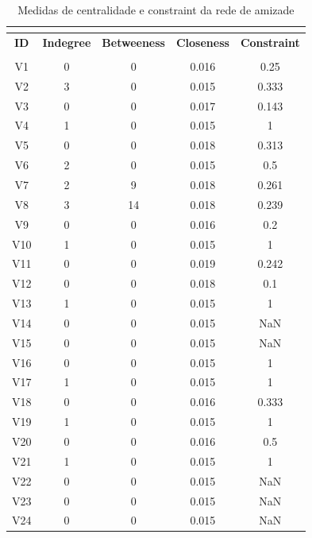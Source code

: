 \documentclass[a4paper, 12pt, openright, oneside, german, french, english, brazil]{abntex2}
\begin{document}
		\begin{SingleSpace}
		\begin{footnotesize}
			\begin{center}
				\begin{longtable}{c c c c c}
					\caption{Medidas de centralidade e constraint da rede de amizade}\\
					\label{centralidades:amizade}\\
					\hline
					\textbf{ID}  & \textbf{Indegree} & \textbf{Betweeness} & \textbf{Closeness} & \textbf{Constraint} \\
					\hline
					\endfirsthead
					\hline
					\endhead
					\hline
					\endfoot
					\hline
					\multicolumn{5}{l}{Fonte: Elaboração do autor}\\
					\endlastfoot
					V1 & 0 & 0 & 0.016 & 0.25 \\ 
					V2 & 3 & 0 & 0.015 & 0.333 \\ 
					V3 & 0 & 0 & 0.017 & 0.143 \\ 
					V4 & 1 & 0 & 0.015 & 1 \\ 
					V5 & 0 & 0 & 0.018 & 0.313 \\ 
					V6 & 2 & 0 & 0.015 & 0.5 \\ 
					V7 & 2 & 9 & 0.018 & 0.261 \\ 
					V8 & 3 & 14 & 0.018 & 0.239 \\ 
					V9 & 0 & 0 & 0.016 & 0.2 \\ 
					V10 & 1 & 0 & 0.015 & 1 \\ 
					V11 & 0 & 0 & 0.019 & 0.242 \\ 
					V12 & 0 & 0 & 0.018 & 0.1 \\ 
					V13 & 1 & 0 & 0.015 & 1 \\ 
					V14 & 0 & 0 & 0.015 & NaN \\ 
					V15 & 0 & 0 & 0.015 & NaN \\ 
					V16 & 0 & 0 & 0.015 & 1 \\ 
					V17 & 1 & 0 & 0.015 & 1 \\ 
					V18 & 0 & 0 & 0.016 & 0.333 \\ 
					V19 & 1 & 0 & 0.015 & 1 \\ 
					V20 & 0 & 0 & 0.016 & 0.5 \\ 
					V21 & 1 & 0 & 0.015 & 1 \\ 
					V22 & 0 & 0 & 0.015 & NaN \\ 
					V23 & 0 & 0 & 0.015 & NaN \\ 
					V24 & 0 & 0 & 0.015 & NaN \\ 

\end{longtable}
\end{center}
\end{footnotesize}
\end{SingleSpace}
\end{document}
